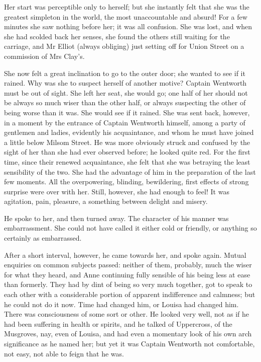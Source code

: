 Her start was perceptible only to herself; but she instantly felt that she was the greatest simpleton in the world, the most unaccountable and absurd! For a few minutes she saw nothing before her; it was all confusion. She was lost, and when she had scolded back her senses, she found the others still waiting for the carriage, and Mr Elliot (always obliging) just setting off for Union Street on a commission of Mrs Clay's.

She now felt a great inclination to go to the outer door; she wanted to see if it rained. Why was she to suspect herself of another motive? Captain Wentworth must be out of sight. She left her seat, she would go; one half of her should not be always so much wiser than the other half, or always suspecting the other of being worse than it was. She would see if it rained. She was sent back, however, in a moment by the entrance of Captain Wentworth himself, among a party of gentlemen and ladies, evidently his acquaintance, and whom he must have joined a little below Milsom Street. He was more obviously struck and confused by the sight of her than she had ever observed before; he looked quite red. For the first time, since their renewed acquaintance, she felt that she was betraying the least sensibility of the two. She had the advantage of him in the preparation of the last few moments. All the overpowering, blinding, bewildering, first effects of strong surprise were over with her. Still, however, she had enough to feel! It was agitation, pain, pleasure, a something between delight and misery.

He spoke to her, and then turned away. The character of his manner was embarrassment. She could not have called it either cold or friendly, or anything so certainly as embarrassed.

After a short interval, however, he came towards her, and spoke again. Mutual enquiries on common subjects passed: neither of them, probably, much the wiser for what they heard, and Anne continuing fully sensible of his being less at ease than formerly. They had by dint of being so very much together, got to speak to each other with a considerable portion of apparent indifference and calmness; but he could not do it now. Time had changed him, or Louisa had changed him. There was consciousness of some sort or other. He looked very well, not as if he had been suffering in health or spirits, and he talked of Uppercross, of the Musgroves, nay, even of Louisa, and had even a momentary look of his own arch significance as he named her; but yet it was Captain Wentworth not comfortable, not easy, not able to feign that he was.

